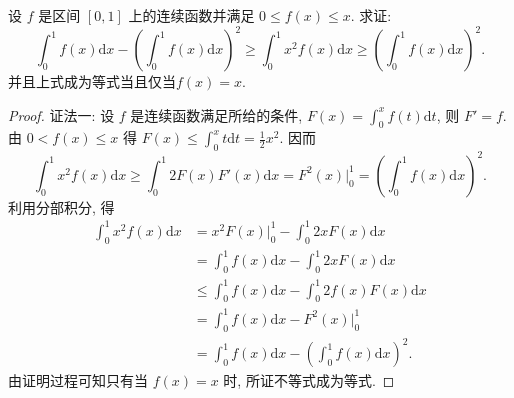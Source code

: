 \documentclass[../../main.tex]{subfiles}
\begin{document}
\begin{example}
设 $f$ 是区间 $[0,1]$ 上的连续函数并满足 $0\leqslant  f(x)\leqslant  x$. 求证:
$$\int_0^1 f(x)\mathrm{d}x-\left(\int_0^1 f(x)\mathrm{d}x\right)^2\geqslant \int_0^1 x^2f(x)\mathrm{d}x\geqslant \left(\int_0^1 f(x)\mathrm{d}x\right)^2.$$
并且上式成为等式当且仅当$f(x)=x$.
\end{example}
\begin{proof}
{\color{blue}证法一:}
设 $f$ 是连续函数满足所给的条件, $F(x)=\int_0^x f(t)\mathrm{d}t$, 则 $F'=f$. 由 $0<f(x)\leqslant  x$ 得 $F(x)\leqslant \int_0^x t\mathrm{d}t=\frac{1}{2}x^2$. 因而
$$\int_0^1 x^2f(x)\mathrm{d}x\geqslant \int_0^1 2F(x)F'(x)\mathrm{d}x=F^2(x)\bigg|_0^1=\left(\int_0^1 f(x)\mathrm{d}x\right)^2.$$
利用分部积分, 得
$$
\begin{aligned}
\int_0^1 x^2f(x)\mathrm{d}x &= x^2F(x)\bigg|_0^1-\int_0^1 2xF(x)\mathrm{d}x \\
&= \int_0^1 f(x)\mathrm{d}x-\int_0^1 2xF(x)\mathrm{d}x \\
&\leqslant  \int_0^1 f(x)\mathrm{d}x-\int_0^1 2f(x)F(x)\mathrm{d}x \\
&= \int_0^1 f(x)\mathrm{d}x-F^2(x)\bigg|_0^1 \\
&= \int_0^1 f(x)\mathrm{d}x-\left(\int_0^1 f(x)\mathrm{d}x\right)^2.
\end{aligned}
$$
由证明过程可知只有当 $f(x)=x$ 时, 所证不等式成为等式.


\end{proof}
\end{document}
